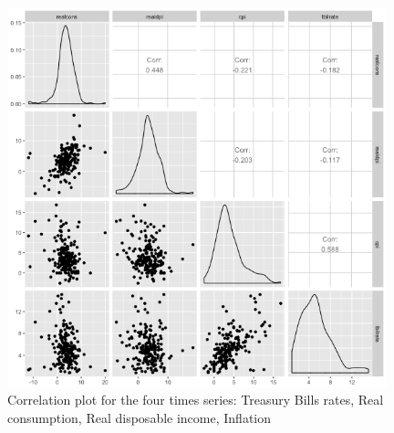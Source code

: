 \begin{figure}[!htb]
\centering
\includegraphics[width=11cm]{gfx/chapter-rvfl-ensembles/scatterplot.png}
\caption{Correlation plot for the four times series: Treasury Bills rates, Real consumption, Real disposable income, Inflation}
\label{corrplot}
\end{figure}
